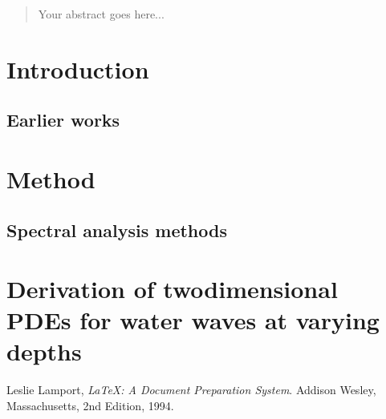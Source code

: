 \documentclass{report}
\begin{document}
\begin{abstract}
    Your abstract goes here...
\end{abstract}

\tableofcontents
\listoffigures
\listoftables

\chapter{Introduction}

\section{Earlier works}

\chapter{Method}

\section{Spectral analysis methods}

\appendix
\chapter{Derivation of twodimensional PDEs for water waves at varying depths}

\begin{thebibliography}{99}
    
    Leslie Lamport,
    \emph{\LaTeX: A Document Preparation System}.
    Addison Wesley, Massachusetts,
    2nd Edition,
    1994.
    
\end{thebibliography}
\end{document}
